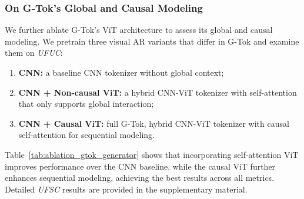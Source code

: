 
\subsubsection{On G-Tok's Global and Causal Modeling}
We further ablate G-Tok's ViT architecture to assess its global and causal modeling. We pretrain three visual AR variants that differ in G-Tok and examine them on \textit{UFUC}: %
\begin{enumerate}
\item \textbf{CNN:} a baseline CNN tokenizer without global context;
\item \textbf{CNN + Non-causal ViT:} a hybrid CNN-ViT tokenizer with self-attention that only supports global interaction;
\item \textbf{CNN + Causal ViT:} full G-Tok, hybrid CNN-ViT tokenizer with causal self-attention for sequential modeling.
\end{enumerate}
Table~\ref{tab:ablation_gtok_generator} shows that incorporating self-attention ViT improves performance over the CNN baseline, while the causal ViT further enhances sequential modeling, achieving the best results across all metrics. Detailed \textit{UFSC} results are provided in the supplementary material.


